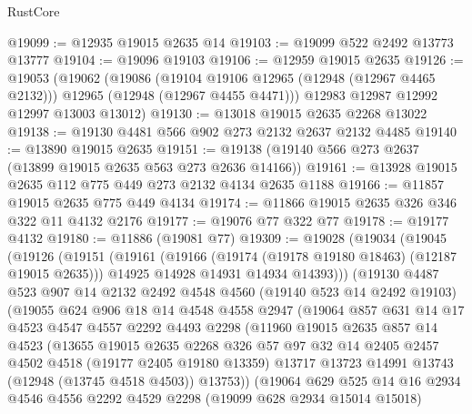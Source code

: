 \begin{lexlean}{RustCore}
\begin{coremodule}
@19099 := @12935 @19015 @2635 @14
@19103 := @19099 @522 @2492 @13773 @13777
@19104 := @19096 @19103
@19106 := @12959 @19015 @2635
@19126 := @19053
    (@19062
      (@19086
        (@19104 @19106 @12965 (@12948 (@12967 @4465 @2132)))
        @12965
        (@12948 (@12967 @4455 @4471)))
      @12983
      @12987
      @12992
      @12997
      @13003
      @13012)
@19130 := @13018 @19015 @2635 @2268 @13022
@19138 := @19130 @4481 @566 @902 @273 @2132 @2637 @2132 @4485
@19140 := @13890 @19015 @2635
@19151 := @19138 (@19140 @566 @273 @2637 (@13899 @19015 @2635 @563 @273 @2636 @14166))
@19161 := @13928 @19015 @2635 @112 @775 @449 @273 @2132 @4134 @2635 @1188
@19166 := @11857 @19015 @2635 @775 @449 @4134
@19174 := @11866 @19015 @2635 @326 @346 @322 @11 @4132 @2176
@19177 := @19076 @77 @322 @77
@19178 := @19177 @4132
@19180 := @11886 (@19081 @77)
@19309 := @19028
    (@19034
      (@19045
        (@19126
          (@19151
            (@19161
              (@19166 (@19174 (@19178 @19180 @18463) (@12187 @19015 @2635)))
              @14925
              @14928
              @14931
              @14934
              @14393)))
        (@19130
          @4487
          @523
          @907
          @14
          @2132
          @2492
          @4548
          @4560
          (@19140 @523 @14 @2492 @19103)
          (@19055
            @624
            @906
            @18
            @14
            @4548
            @4558
            @2947
            (@19064
              @857
              @631
              @14
              @17
              @4523
              @4547
              @4557
              @2292
              @4493
              @2298
              (@11960
                @19015
                @2635
                @857
                @14
                @4523
                (@13655
                  @19015
                  @2635
                  @2268
                  @326
                  @57
                  @97
                  @32
                  @14
                  @2405
                  @2457
                  @4502
                  @4518
                  (@19177 @2405 @19180 @13359)
                  @13717
                  @13723
                  @14991
                  @13743
                  (@12948 (@13745 @4518 @4503))
                  @13753))
              (@19064
                @629
                @525
                @14
                @16
                @2934
                @4546
                @4556
                @2292
                @4529
                @2298
                (@19099 @628 @2934 @15014 @15018)

\end{coremodule}
\end{lexlean}

